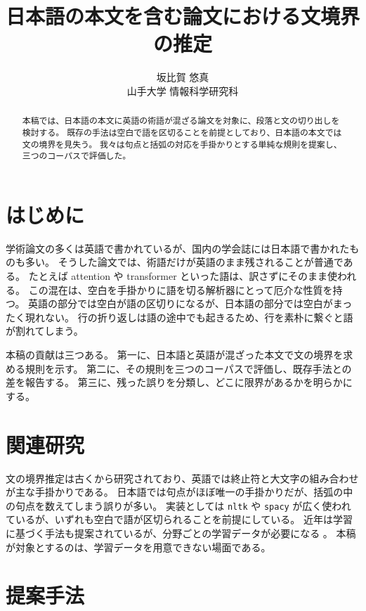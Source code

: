 \documentclass[11pt,a4paper]{article}
\title{日本語の本文を含む論文における文境界の推定}
\author{坂比賀 悠真\\ 山手大学 情報科学研究科}
\date{}
\newcommand{\s}[1]{#1}
\begin{document}
\maketitle

\begin{abstract}
\s{本稿では、日本語の本文に英語の術語が混ざる論文を対象に、段落と文の切り出しを検討する。}%
\s{既存の手法は空白で語を区切ることを前提としており、日本語の本文では文の境界を見失う。}%
\s{我々は句点と括弧の対応を手掛かりとする単純な規則を提案し、三つのコーパスで評価した。}%
\end{abstract}

\section{はじめに}

\s{学術論文の多くは英語で書かれているが、国内の学会誌には日本語で書かれたものも多い。}%
\s{そうした論文では、術語だけが英語のまま残されることが普通である。}%
\s{たとえば attention や transformer といった語は、訳さずにそのまま使われる。}%
\s{この混在は、空白を手掛かりに語を切る解析器にとって厄介な性質を持つ。}%
\s{英語の部分では空白が語の区切りになるが、日本語の部分では空白がまったく現れない。}%
\s{行の折り返しは語の途中でも起きるため、行を素朴に繋ぐと語が割れてしまう。}%

\s{本稿の貢献は三つある。}%
\s{第一に、日本語と英語が混ざった本文で文の境界を求める規則を示す。}%
\s{第二に、その規則を三つのコーパスで評価し、既存手法との差を報告する。}%
\s{第三に、残った誤りを分類し、どこに限界があるかを明らかにする。}%

\section{関連研究}

\s{文の境界推定は古くから研究されており、英語では終止符と大文字の組み合わせが主な手掛かりである。}%
\s{日本語では句点がほぼ唯一の手掛かりだが、括弧の中の句点を数えてしまう誤りが多い。}%
\s{実装としては \texttt{nltk} や \texttt{spacy} が広く使われているが、いずれも空白で語が区切られることを前提にしている。}%
\s{近年は学習に基づく手法も提案されているが、分野ごとの学習データが必要になる \cite{sato2021}。}%
\s{本稿が対象とするのは、学習データを用意できない場面である。}%

\section{提案手法}
\end{document}
